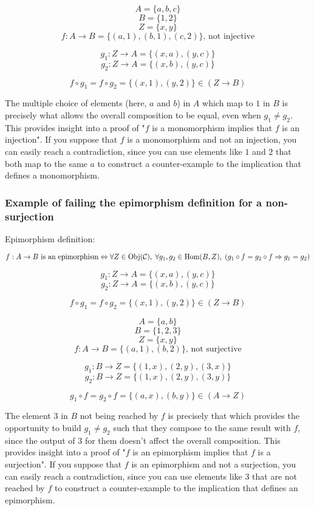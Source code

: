 \documentclass[12pt, letterpaper, twoside]{report}
\begin{document}
$$A = \{ a, b, c \}$$
$$B = \{ 1, 2    \}$$
$$Z = \{ x, y    \}$$
$$f : A \to B = \{ (a, 1), (b, 1), (c, 2) \} \text{, not injective}$$

$$g_1 : Z \to A = \{ (x, a), (y, c) \}$$
$$g_2 : Z \to A = \{ (x, b), (y, c) \}$$

$$f \circ g_1 = f \circ g_2 = \{(x, 1), (y, 2)\} \in (Z \to B)$$

The multiple choice of elements (here, $a$ and $b$) in $A$ which map to $1$ in $B$ is precisely what allows the overall composition to be equal, even when $g_1 \neq g_2$. This provides insight into a proof of "$f$ is a monomorphism implies that $f$ is an injection". If you suppose that $f$ is a monomorphism and not an injection, you can easily reach a contradiction, since you can use elements like $1$ and $2$ that both map to the same $a$ to construct a counter-example to the implication that defines a monomorphism.



\subsubsection*{Example of failing the epimorphism definition for a non-surjection}

Epimorphism definition:

$$
\text{$f : A \to B$ is an epimorphism}
\\ \Leftrightarrow \\ 
\forall Z \in \text{Obj}(\mathcal{C}), \;
\forall g_1, g_2 \in \text{Hom}(B, Z), \;
(g_1 \circ f = g_2 \circ f \Rightarrow g_1 = g_2)
$$



$$g_1 : Z \to A = \{ (x, a), (y, c) \}$$
$$g_2 : Z \to A = \{ (x, b), (y, c) \}$$

$$f \circ g_1 = f \circ g_2 = \{(x, 1), (y, 2)\} \in (Z \to B)$$


$$A = \{ a, b    \}$$
$$B = \{ 1, 2, 3 \}$$
$$Z = \{ x, y    \}$$
$$f : A \to B = \{ (a, 1), (b, 2) \} \text{, not surjective}$$


$$g_1 : B \to Z = \{ (1, x), (2, y), (3, x) \}$$
$$g_2 : B \to Z = \{ (1, x), (2, y), (3, y) \}$$

$$g_1 \circ f = g_2 \circ f = \{(a, x), (b, y)\} \in (A \to Z)$$

The element $3$ in $B$ not being reached by $f$ is precisely that which provides the opportunity to build $g_1 \neq g_2$ such that they compose to the same result with $f$, since the output of $3$ for them doesn't affect the overall composition. This provides insight into a proof of "$f$ is an epimorphism implies that $f$ is a surjection". If you suppose that $f$ is an epimorphism and not a surjection, you can easily reach a contradiction, since you can use elements like $3$ that are not reached by $f$ to construct a counter-example to the implication that defines an epimorphism.
\end{document}
